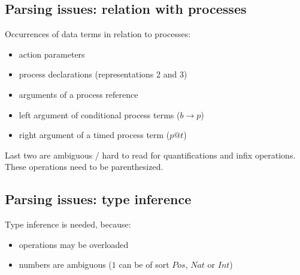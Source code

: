\documentclass{article}
\newcommand{\frm}[1]{\mbox{\ensuremath{#1}}}
\newcommand{\f}[1]{\ensuremath{\mathit{#1}}}
\newcommand{\To}{\ensuremath{\rightarrow}}
\newcommand{\srtpos}{\f{Pos}}
\newcommand{\srtnat}{\f{Nat}}
\newcommand{\srtint}{\f{Int}}
\begin{document}
\begin{slidetop}
\section*{Parsing issues: relation with processes}

Occurrences of data terms in relation to processes:
\begin{itemize}
\item action parameters
\item process declarations (representations 2 and 3)
\item arguments of a process reference
\item left argument of conditional process terms (\frm{b \To p})
\item right argument of a timed process term (\frm{p @ t})
\end{itemize}

\bigskip
Last two are ambiguous / hard to read for quantifications and infix operations. These operations need to be parenthesized.
\end{slidetop}

\begin{slidetop}
\section*{Parsing issues: type inference}

Type inference is needed, because:
\begin{itemize}
\item operations may be overloaded
\item numbers are ambiguous (\frm{1} can be of sort \frm{\srtpos}, \frm{\srtnat} or \frm{\srtint})
\end{itemize}
\end{slidetop}
\end{document}
